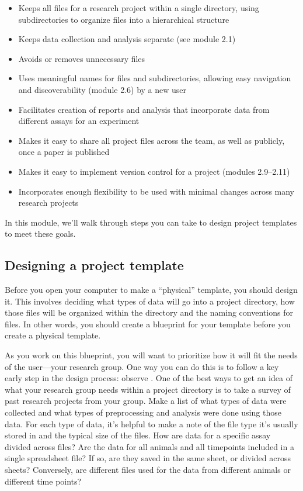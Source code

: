 \documentclass[]{tufte-book}
\providecommand{\tightlist}{%
  \setlength{\itemsep}{0pt}\setlength{\parskip}{0pt}}
\begin{document}
\begin{itemize}
\tightlist
\item
  Keeps all files for a research project within a single directory, using
  subdirectories to organize files into a hierarchical structure
\item
  Keeps data collection and analysis separate (see module 2.1)
\item
  Avoids or removes unnecessary files
\item
  Uses meaningful names for files and subdirectories, allowing easy navigation
  and discoverability (module 2.6) by a new user
\item
  Facilitates creation of reports and analysis that incorporate data from
  different assays for an experiment
\item
  Makes it easy to share all project files across the team, as well as
  publicly, once a paper is published
\item
  Makes it easy to implement version control for a project (modules 2.9--2.11)
\item
  Incorporates enough flexibility to be used with minimal changes across many
  research projects
\end{itemize}

In this module, we'll walk through steps you can take to design project
templates to meet these goals.

\subsection{Designing a project template}\label{designing-a-project-template}

Before you open your computer to make a ``physical'' template, you should design
it. This involves deciding what types of data will go into a project directory,
how those files will be organized within the directory and the naming conventions
for files. In other words, you should create a blueprint for
your template before you create a physical template.

As you work on this blueprint, you will want to prioritize how it will fit the
needs of the user---your research group. One way you can do this is to follow a
key early step in the design process: observe \citep{osann2020design}. One of the
best ways to get an idea of what your research group needs within a project
directory is to take a survey of past research projects from your group. Make a
list of what types of data were collected and what types of preprocessing and
analysis were done using those data. For each type of data, it's helpful to make
a note of the file type it's usually stored in and the typical size of the
files. How are data for a specific assay divided across files? Are the data for
all animals and all timepoints included in a single spreadsheet file? If so, are
they saved in the same sheet, or divided across sheets? Conversely, are
different files used for the data from different animals or different time
points?
\end{document}
